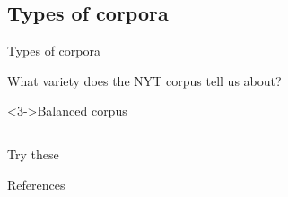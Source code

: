 \documentclass{beamer}
\newcommand{\subtwotwo}{Types of corpora}
\begin{document}
    \subsection{\subtwotwo}
      \begin{frame}{\subtwotwo}
        \begin{block}{What variety does the NYT corpus tell us about?}
        \end{block}
        \begin{alertblock}<3->{Balanced corpus}
          
        \end{alertblock}
      \end{frame}

    \subsection{}
      \begin{frame}{}
        \begin{block}{Try these}
        \end{block}
      \end{frame}

      \begin{frame}{References}
      \end{frame}
\end{document}
